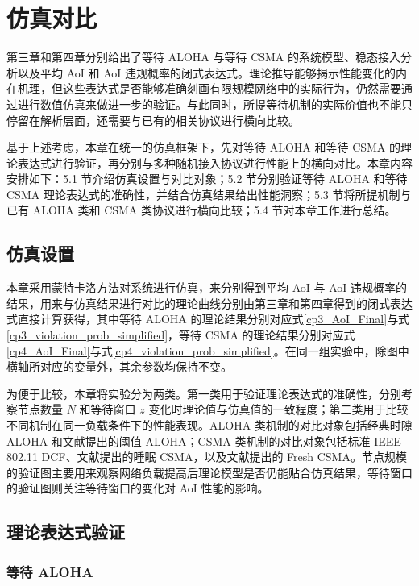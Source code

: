 \clearpage

\section{仿真对比}

第三章和第四章分别给出了等待 ALOHA 与等待 CSMA 的系统模型、稳态接入分析以及平均 AoI 和 AoI 违规概率的闭式表达式。理论推导能够揭示性能变化的内在机理，但这些表达式是否能够准确刻画有限规模网络中的实际行为，仍然需要通过进行数值仿真来做进一步的验证。与此同时，所提等待机制的实际价值也不能只停留在解析层面，还需要与已有的相关协议进行横向比较。

基于上述考虑，本章在统一的仿真框架下，先对等待 ALOHA 和等待 CSMA 的理论表达式进行验证，再分别与多种随机接入协议进行性能上的横向对比。本章内容安排如下：5.1 节介绍仿真设置与对比对象；5.2 节分别验证等待 ALOHA 和等待 CSMA 理论表达式的准确性，并结合仿真结果给出性能洞察；5.3 节将所提机制与已有 ALOHA 类和 CSMA 类协议进行横向比较；5.4 节对本章工作进行总结。

\subsection{仿真设置}

本章采用蒙特卡洛方法对系统进行仿真，来分别得到平均 AoI 与 AoI 违规概率的结果，用来与仿真结果进行对比的理论曲线分别由第三章和第四章得到的闭式表达式直接计算获得，其中等待 ALOHA 的理论结果分别对应式\eqref{cp3_AoI_Final}与式\eqref{cp3_violation_prob_simplified}，等待 CSMA 的理论结果分别对应式\eqref{cp4_AoI_Final}与式\eqref{cp4_violation_prob_simplified}。在同一组实验中，除图中横轴所对应的变量外，其余参数均保持不变。

为便于比较，本章将实验分为两类。第一类用于验证理论表达式的准确性，分别考察节点数量 $N$ 和等待窗口 $z$ 变化时理论值与仿真值的一致程度；第二类用于比较不同机制在同一负载条件下的性能表现。ALOHA 类机制的对比对象包括经典时隙 ALOHA 和文献\cite{yavascan2021analysis}提出的阈值 ALOHA；CSMA 类机制的对比对象包括标准 IEEE 802.11 DCF、文献\cite{maatouk2020age}提出的睡眠 CSMA，以及文献\cite{tripathi2023fresh}提出的 Fresh CSMA。节点规模的验证图主要用来观察网络负载提高后理论模型是否仍能贴合仿真结果，等待窗口的验证图则关注等待窗口的变化对 AoI 性能的影响。

\subsection{理论表达式验证}

\subsubsection{等待 ALOHA}

